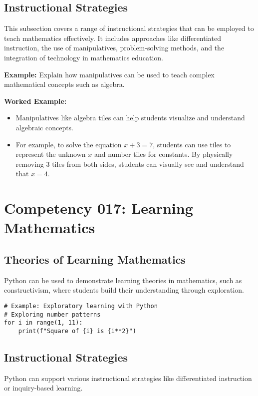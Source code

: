 \documentclass{book}
\begin{document}
\subsection{Instructional Strategies}
This subsection covers a range of instructional strategies that can be employed to teach mathematics effectively. It includes approaches like differentiated instruction, the use of manipulatives, problem-solving methods, and the integration of technology in mathematics education.


\textbf{Example:} Explain how manipulatives can be used to teach complex mathematical concepts such as algebra.


\textbf{Worked Example:}
\begin{itemize}
        \item Manipulatives like algebra tiles can help students visualize and understand algebraic concepts.
        \item For example, to solve the equation \( x + 3 = 7 \), students can use tiles to represent the unknown \( x \) and number tiles for constants. By physically removing 3 tiles from both sides, students can visually see and understand that \( x = 4 \).
\end{itemize}


\section{Competency 017: Learning Mathematics}
\subsection{Theories of Learning Mathematics}
Python can be used to demonstrate learning theories in mathematics, such as constructivism, where students build their understanding through exploration.


\begin{lstlisting}[style=pythonstyle]
# Example: Exploratory learning with Python
# Exploring number patterns
for i in range(1, 11):
    print(f"Square of {i} is {i**2}")
\end{lstlisting}


\subsection{Instructional Strategies}
Python can support various instructional strategies like differentiated instruction or inquiry-based learning.
\end{document}
